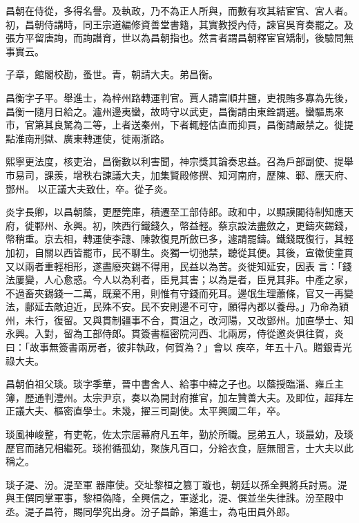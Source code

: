 \begin{pinyinscope}
 昌朝在侍從，多得名譽。及執政，乃不為正人所與，而數有攻其結宦官、宮人者。初，昌朝侍講時，同王宗道編修資善堂書籍，其實教授內侍，諫官吳育奏罷之。及張方平留唐詢，而詢譖育，世以為昌朝指也。然言者謂昌朝釋宦官矯制，後驗問無事實云。



 子章，館閣校勘，蚤世。青，朝請大夫。弟昌衡。



 昌衡字子平。舉進士，為梓州路轉運判官。賈人請富順井鹽，吏視賄多寡為先後，昌衡一隨月日給之。瀘州邊夷蠻，故時守以武吏，昌衡請由東銓調選。蠻驅馬來市，官第其良駑為二等，上者送秦州，下者輒輕估直而抑買，昌衡請嚴禁之。徙提點淮南刑獄、廣東轉運使，徙兩浙路。



 熙寧更法度，核吏治，昌衡數以利害聞，神宗獎其論奏忠益。召為戶部副使、提舉市易司，課羨，增秩右諫議大夫，加集賢殿修撰、知河南府，歷陳、鄆、應天府、鄧州。
 以正議大夫致仕，卒。從子炎。



 炎字長卿，以昌朝蔭，更歷筦庫，積遷至工部侍郎。政和中，以顯謨閣待制知應天府，徙鄆州、永興。初，陜西行鐵錢久，幣益輕。蔡京設法盡斂之，更鑄夾錫錢，幣稍重。京去相，轉運使李譓、陳敦復見所斂已多，遽請罷鑄。鐵錢既復行，其輕加初，自關以西皆罷市，民不聊生。炎獨一切弛禁，聽從其便。其後，宣徽使童貫又以兩者重輕相形，遂盡廢夾錫不得用，民益以為苦。炎徙知延安，因表
 言：「錢法屢變，人心愈惑。今人以為利者，臣見其害；以為是者，臣見其非。中產之家，不過畜夾錫錢一二萬，既棄不用，則惟有守錢而死耳。邊氓生理蕭條，官又一再變法，鄜延去敵迫近，民殊不安。民不安則邊不可守，願得內郡以養母。」乃命為穎州，未行，復留。又與貫制疆事不合，貫沮之，改河陽，又改鄧州。加直學士、知永興。入對，留為工部侍郎。貫簽書樞密院河西、北兩房，侍從邀炎俱往賀，炎曰：「故事無簽書兩房者，彼非執政，何賀為？」會以
 疾卒，年五十八。贈銀青光祿大夫。



 昌朝伯祖父琰。琰字季華，晉中書舍人、給事中緯之子也。以蔭授臨淄、雍丘主簿，歷通判澧州。太宗尹京，奏以為開封府推官，加左贊善大夫。及即位，超拜左正議大夫、樞密直學士。未幾，擢三司副使。太平興國二年，卒。



 琰風神峻整，有吏乾，佐太宗居幕府凡五年，勤於所職。昆弟五人，琰最幼，及琰歷官而諸兄相繼死。琰拊循孤幼，聚族凡百口，分給衣食，庭無間言，士大夫以此稱之。



 琰子湜、汾。湜至軍
 器庫使。交址黎桓之篡丁璇也，朝廷以孫全興將兵討焉。湜與王僎同掌軍事，黎桓偽降，全興信之，軍遂北，湜、僎並坐失律誅。汾至殿中丞。湜子昌符，賜同學究出身。汾子昌齡，第進士，為屯田員外郎。




\end{pinyinscope}
